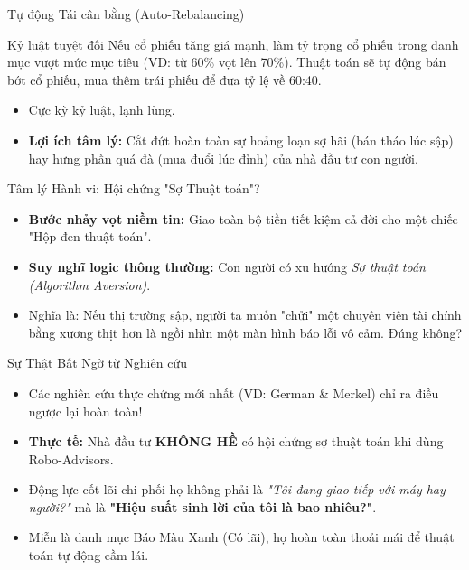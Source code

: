 \documentclass[aspectratio=169, 12pt]{beamer}
\begin{document}
\begin{frame}{Tự động Tái cân bằng (Auto-Rebalancing)}
    \begin{block}{Kỷ luật tuyệt đối}
        Nếu cổ phiếu tăng giá mạnh, làm tỷ trọng cổ phiếu trong danh mục vượt mức mục tiêu (VD: từ 60\% vọt lên 70\%). Thuật toán sẽ tự động bán bớt cổ phiếu, mua thêm trái phiếu để đưa tỷ lệ về 60:40.
    \end{block}
    \begin{itemize}
        \item Cực kỳ kỷ luật, lạnh lùng.
        \item \textbf{Lợi ích tâm lý:} Cắt đứt hoàn toàn sự hoảng loạn sợ hãi (bán tháo lúc sập) hay hưng phấn quá đà (mua đuổi lúc đỉnh) của nhà đầu tư con người.
    \end{itemize}
\end{frame}

\begin{frame}{Tâm lý Hành vi: Hội chứng "Sợ Thuật toán"?}
    \begin{itemize}
        \item \textbf{Bước nhảy vọt niềm tin:} Giao toàn bộ tiền tiết kiệm cả đời cho một chiếc "Hộp đen thuật toán".
        \item \textbf{Suy nghĩ logic thông thường:} Con người có xu hướng \textit{Sợ thuật toán (Algorithm Aversion)}.
        \item Nghĩa là: Nếu thị trường sập, người ta muốn "chửi" một chuyên viên tài chính bằng xương thịt hơn là ngồi nhìn một màn hình báo lỗi vô cảm. Đúng không?
    \end{itemize}
\end{frame}

\begin{frame}{Sự Thật Bất Ngờ từ Nghiên cứu}
    \begin{itemize}
        \item Các nghiên cứu thực chứng mới nhất (VD: German \& Merkel) chỉ ra điều ngược lại hoàn toàn!
        \item \textbf{Thực tế:} Nhà đầu tư \textbf{KHÔNG HỀ} có hội chứng sợ thuật toán khi dùng Robo-Advisors.
        \item Động lực cốt lõi chi phối họ không phải là \textit{"Tôi đang giao tiếp với máy hay người?"} mà là \textbf{"Hiệu suất sinh lời của tôi là bao nhiêu?"}.
        \item Miễn là danh mục Báo Màu Xanh (Có lãi), họ hoàn toàn thoải mái để thuật toán tự động cầm lái.
    \end{itemize}
\end{frame}
\end{document}
